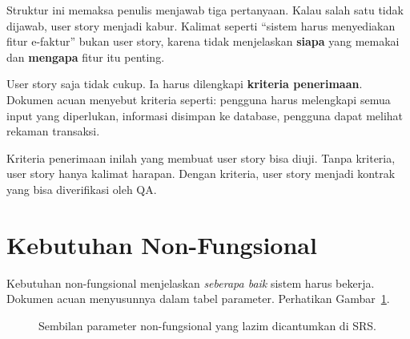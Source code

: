 \documentclass[11pt,a4paper]{article}
\begin{document}
Struktur ini memaksa penulis menjawab tiga pertanyaan. Kalau salah satu tidak dijawab, user story menjadi kabur. Kalimat seperti ``sistem harus menyediakan fitur e-faktur'' bukan user story, karena tidak menjelaskan \textbf{siapa} yang memakai dan \textbf{mengapa} fitur itu penting.

User story saja tidak cukup. Ia harus dilengkapi \textbf{kriteria penerimaan}. Dokumen acuan menyebut kriteria seperti: pengguna harus melengkapi semua input yang diperlukan, informasi disimpan ke database, pengguna dapat melihat rekaman transaksi.

Kriteria penerimaan inilah yang membuat user story bisa diuji. Tanpa kriteria, user story hanya kalimat harapan. Dengan kriteria, user story menjadi kontrak yang bisa diverifikasi oleh QA.

\section{Kebutuhan Non-Fungsional}

\label{sec:nfr}

Kebutuhan non-fungsional menjelaskan \textit{seberapa baik} sistem harus bekerja. Dokumen acuan menyusunnya dalam tabel parameter. Perhatikan Gambar~\ref{fig:nfr-params}.

\begin{figure}[H]
	\centering
	\caption{Sembilan parameter non-fungsional yang lazim dicantumkan di SRS.}
	\label{fig:nfr-params}
\end{figure}
\end{document}

